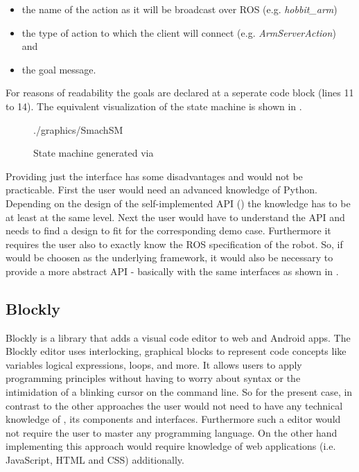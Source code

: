 \begin{itemize}
	\item the name of the action as it will be broadcast over ROS (e.g. \textit{hobbit\_arm})
	\item the type of action to which the client will connect (e.g. \textit{ArmServerAction}) and
	\item the goal message.
\end{itemize}

For reasons of readability the goals are declared at a seperate code block (lines 11 to 14). The equivalent visualization of the state machine is shown in . \\

\begin{figure}[htbp]
	
\end{figure}

\begin{figure}[htbp]
	\centering
	\begin{overpic}[width=0.7\linewidth]{./graphics/SmachSM}
	\end{overpic}
	\caption{State machine generated via }%
	\label{fig:SmachSM}%
\end{figure}

Providing just the \smach{} interface has some disadvantages and would not be practicable. First the user would need an advanced knowledge of Python. Depending on the design of the self-implemented API () the knowledge has to be at least at the same level. Next the user would have to understand the API and needs to find a design to fit for the corresponding demo case. Furthermore it requires the user also to exactly know the ROS specification of the robot. So, if \smach{} would be choosen as the underlying framework, it would also be necessary to provide a more abstract API - basically with the same interfaces as shown in .

\subsection{Blockly} \label{sub:Blockly}
Blockly is a library that adds a visual code editor to web and Android apps. The Blockly editor uses interlocking, graphical blocks to represent code concepts like variables logical expressions, loops, and more. It allows users to apply programming principles without having to worry about syntax or the intimidation of a blinking cursor on the command line. \cite{BlocklyIntro} So for the present case, in contrast to the other approaches the user would not need to have any technical knowledge of \hobbit{}, its components and interfaces. Furthermore such a editor would not require the user to master any programming language. On the other hand implementing this approach would require knowledge of web applications (i.e. JavaScript, HTML and CSS) additionally. \\

